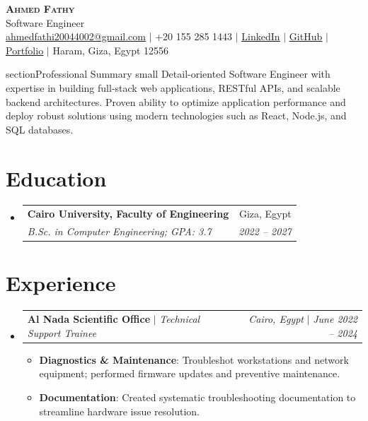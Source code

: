 \documentclass[letterpaper,11pt]{article}
\makeatletter
\newcommand{\resumeItem}[2]{\item\small{\textbf{#1}{: #2 \vspace{-2pt}}}}
\newcommand{\resumeSubheading}[4]{
  \vspace{-1pt}\item
    \begin{tabular*}{0.97\textwidth}{l@{\extracolsep{\fill}}r}
      \textbf{#1} & #2 \\
      \textit{\small#3} & \textit{\small #4} \\
    \end{tabular*}\vspace{-5pt}
}
\newcommand{\resumeActivitySubheading}[4]{
  \vspace{-1pt}\item
    \begin{tabular*}{0.97\textwidth}{l@{\extracolsep{\fill}}r}
      \textbf{#1} $|$ \textit{\small#3} & \textit{\small#2} $|$ \textit{\small #4} \\
    \end{tabular*}\vspace{-5pt}
}
\newcommand{\resumeSubHeadingListStart}{\begin{itemize}[leftmargin=*]}
\newcommand{\resumeSubHeadingListEnd}{\end{itemize}}
\newcommand{\resumeItemListStart}{\begin{itemize}}
\newcommand{\resumeItemListEnd}{\end{itemize}\vspace{-6pt}}
\makeatother
\begin{document}
\begin{center}
    \textbf{\Huge \scshape Ahmed Fathy} \\ \vspace{1pt}
    \small Software Engineer \\
    \href{mailto:ahmedfathi20044002@gmail.com}{\underline{ahmedfathi20044002@gmail.com}} $|$
    +20 155 285 1443 $|$
    \href{https://www.linkedin.com/in/ahmedfathy-x1}{\underline{LinkedIn}} $|$
    \href{https://github.com/ahmedfathy0-0}{\underline{GitHub}} $|$
    \href{https://www.mrfathi.tech/}{\underline{Portfolio}} $|$
    Haram, Giza, Egypt 12556
\end{center}


section{Professional Summary}
  small Detail-oriented Software Engineer with expertise in building full-stack web applications, RESTful APIs, and scalable backend architectures. Proven ability to optimize application performance and deploy robust solutions using modern technologies such as React, Node.js, and SQL databases.
  \vspace{2pt}
\section{Education}
  \resumeSubHeadingListStart
    \resumeSubheading
      {Cairo University, Faculty of Engineering}{Giza, Egypt}
      {B.Sc. in Computer Engineering;  GPA: 3.7}{2022 -- 2027}
  \resumeSubHeadingListEnd
  \vspace{-2pt}
\section{Experience}
  \resumeSubHeadingListStart
    \resumeActivitySubheading
      {Al Nada Scientific Office}{Cairo, Egypt}{Technical Support Trainee}{June 2022 -- 2024}
      \resumeItemListStart
        \resumeItem{Diagnostics \& Maintenance}
          {Troubleshot workstations and network equipment; performed firmware updates and preventive maintenance.}
        \resumeItem{Documentation}
          {Created systematic troubleshooting documentation to streamline hardware issue resolution.}
      \resumeItemListEnd
  \resumeSubHeadingListEnd
  \vspace{-2pt}
\end{document}

